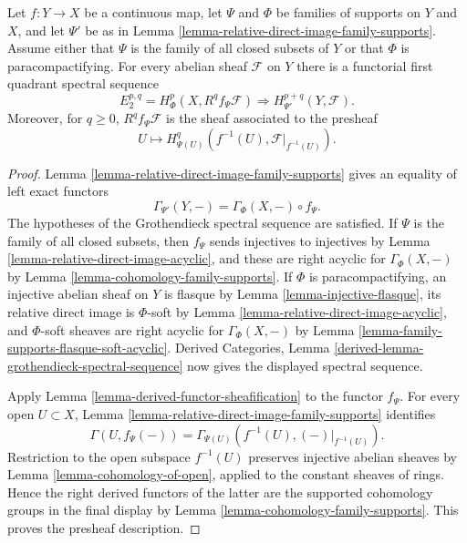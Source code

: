 \begin{lemma}
\label{lemma-relative-Leray-family-supports}
\begin{reference}
\cite[Chapter III, \S 3.7, Theorem 3.7.3, p. 173]{Tohoku}
\end{reference}
Let $f : Y \to X$ be a continuous map, let $\Psi$ and $\Phi$ be families
of supports on $Y$ and $X$, and let $\Psi'$ be as in Lemma
\ref{lemma-relative-direct-image-family-supports}. Assume either that
$\Psi$ is the family of all closed subsets of $Y$ or that $\Phi$ is
paracompactifying. For every abelian sheaf $\mathcal{F}$ on $Y$ there is a
functorial first quadrant spectral sequence
$$
E_2^{p,q}=H^p_\Phi(X,R^qf_\Psi\mathcal{F})
\Rightarrow H^{p+q}_{\Psi'}(Y,\mathcal{F}).
$$
Moreover, for $q\geq0$, $R^qf_\Psi\mathcal{F}$ is the sheaf associated to
the presheaf
$$
U \longmapsto
H^q_{\Psi(U)}(f^{-1}(U),\mathcal{F}|_{f^{-1}(U)}).
$$
\end{lemma}

\begin{proof}
Lemma \ref{lemma-relative-direct-image-family-supports} gives an equality
of left exact functors
$$
\Gamma_{\Psi'}(Y,-)=\Gamma_\Phi(X,-)\circ f_\Psi.
$$
The hypotheses of the Grothendieck spectral sequence are satisfied. If
$\Psi$ is the family of all closed subsets, then $f_\Psi$ sends injectives
to injectives by Lemma \ref{lemma-relative-direct-image-acyclic}, and these
are right acyclic for $\Gamma_\Phi(X,-)$ by Lemma
\ref{lemma-cohomology-family-supports}. If $\Phi$ is paracompactifying, an
injective abelian sheaf on $Y$ is flasque by Lemma
\ref{lemma-injective-flasque}, its relative direct image is $\Phi$-soft by
Lemma \ref{lemma-relative-direct-image-acyclic}, and $\Phi$-soft sheaves are
right acyclic for $\Gamma_\Phi(X,-)$ by Lemma
\ref{lemma-family-supports-flasque-soft-acyclic}. Derived Categories, Lemma
\ref{derived-lemma-grothendieck-spectral-sequence} now gives the displayed
spectral sequence.

Apply Lemma \ref{lemma-derived-functor-sheafification} to the functor
$f_\Psi$. For every open $U\subset X$, Lemma
\ref{lemma-relative-direct-image-family-supports} identifies
$$
\Gamma(U,f_\Psi(-))
=\Gamma_{\Psi(U)}(f^{-1}(U),(-)|_{f^{-1}(U)}).
$$
Restriction to the open subspace $f^{-1}(U)$ preserves injective abelian
sheaves by Lemma \ref{lemma-cohomology-of-open}, applied to the constant
sheaves of rings. Hence the right derived functors of the latter are the
supported cohomology groups in the final display by Lemma
\ref{lemma-cohomology-family-supports}. This proves the presheaf
description.
\end{proof}


